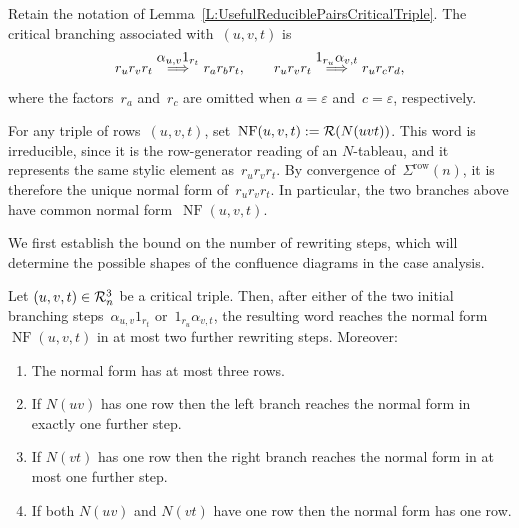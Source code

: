 \documentclass[a4paper, twoside, 11pt, english]{article}
\begin{document}
Retain the notation of Lemma~\ref{L:UsefulReduciblePairsCriticalTriple}.
The critical branching associated with~$(u,v,t)$ is
\[
r_u r_v r_t
\overset{\displaystyle \alpha_{u,v}1_{r_t}}{\Longrightarrow}
r_a r_b r_t,
\qquad
r_u r_v r_t
\overset{\displaystyle 1_{r_u}\alpha_{v,t}}{\Longrightarrow}
r_u r_c r_d,
\]
where the factors~$r_a$ and~$r_c$ are omitted when
$a=\varepsilon$ and~$c=\varepsilon$, respectively.

For any triple of rows~$(u,v,t)$, set~$\operatorname{NF}(u,v,t):=\mathcal{R}(N(uvt))$.
This word is irreducible, since it is the row-generator reading of an
$N$-tableau, and it represents the same stylic element as~$r_ur_vr_t$.
By convergence of~$\Sigma^{\mathrm{row}}(n)$, it is therefore the unique
normal form of~$r_ur_vr_t$. In particular, the two branches above have
common normal form~$\operatorname{NF}(u,v,t)$.

We first establish the bound on the number of rewriting steps, which will 
determine the possible shapes of the confluence diagrams in the case analysis.

\begin{proposition}
\label{Prop:boundedBranching}
Let $(u,v,t)\in \mathcal{R}_n^3$ be a critical triple. Then, after either of the two initial branching steps~$\alpha_{u,v}1_{r_t}$ or~$1_{r_u}\alpha_{v,t}$,
the resulting word reaches the normal form $\operatorname{NF}(u,v,t)$ in at
most two further rewriting steps. Moreover:
\begin{enumerate}[\bf i)]
\item The normal form has at most three rows.
\item If $N(uv)$ has one row then the left branch reaches the normal 
      form in exactly one further step.
\item If $N(vt)$ has one row then the right branch reaches the normal 
      form in at most one further step.
\item If both $N(uv)$ and $N(vt)$ have one row then the normal form 
      has one row.
\end{enumerate}
\end{proposition}
\end{document}
